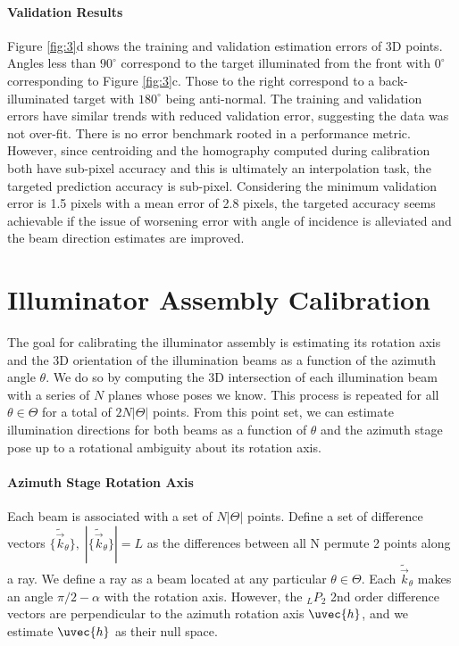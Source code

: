\paragraph{Validation Results} Figure \ref{fig:3}d shows the training and validation estimation errors of 3D points. Angles less than $90^\circ$ correspond to the target illuminated from the front with $0^\circ$ corresponding to Figure \ref{fig:3}c. Those to the right correspond to a back-illuminated target with $180^\circ$ being anti-normal. The training and validation errors have similar trends with reduced validation error, suggesting the data was not over-fit. There is no error benchmark rooted in a performance metric. However, since centroiding and the homography computed during calibration both have sub-pixel accuracy and this is ultimately an interpolation task, the targeted prediction accuracy is sub-pixel. Considering the minimum validation error is 1.5 pixels with a mean error of 2.8 pixels, the targeted accuracy seems achievable if the issue of worsening error with angle of incidence is alleviated and the beam direction estimates are improved.

\section{Illuminator Assembly Calibration}
The goal for calibrating the illuminator assembly is estimating its rotation axis and the 3D orientation of the illumination beams as a function of the azimuth angle $\theta$. We do so by computing the 3D intersection of each illumination beam with a series of $N$ planes whose poses we know. This process is repeated for all $\theta \in \Theta$ for a total of $2N|\Theta|$ points. From this point set, we can estimate illumination directions for both beams as a function of $\theta$ and the azimuth stage pose up to a rotational ambiguity about its rotation axis.

\paragraph{Azimuth Stage Rotation Axis}
Each beam is associated with a set of $N|\Theta|$ points. Define a set of difference vectors $\{\tilde{\vec{k}}_\theta\}, \; |\{\tilde{\vec{k}}_\theta\}| = L$ as the differences between all N permute 2 points along a ray. We define a ray as a beam located at any particular $\theta \in \Theta$. Each $\tilde{\vec{k}}_\theta$ makes an angle $\pi/2 - \alpha$ with the rotation axis. However, the $_L P_2$ 2nd order difference vectors are perpendicular to the azimuth rotation axis $\uvec{h}$, and we estimate $\uvec{h}$ as their null space.


